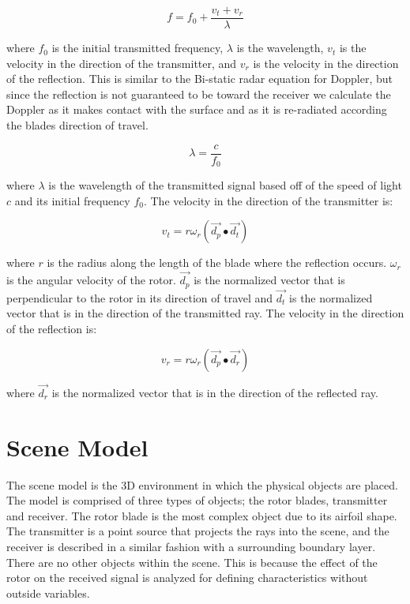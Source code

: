 \begin{equation}
	f = f_0 + \frac{v_t + v_r}{\lambda} %
	\label{eqn:observedShift}	
\end{equation}

where $f_0$ is the initial transmitted frequency, $\lambda$ is the wavelength, $v_t$ is the velocity in the direction of the transmitter, and $v_r$ is the velocity in the direction of the reflection. This is similar to the Bi-static radar equation for Doppler, but since the reflection is not guaranteed to be toward the receiver we calculate the Doppler as it makes contact with the surface and as it is re-radiated according the blades direction of travel.

\begin{equation}
	\lambda = \frac{c}{f_0}
	\label{eqn:wavelength}
\end{equation}

where $\lambda$ is the wavelength of the transmitted signal based off of the speed of light $c$ and its initial frequency $f_0$. The velocity in the direction of the transmitter is:

\begin{equation}
	v_t = r \omega_r (\vec{d_p} \bullet \vec{d_t})
	\label{eqn:v_t}
\end{equation}

where $r$ is the radius along the length of the blade where the reflection occurs. $\omega_r$ is the angular velocity of the rotor. $\vec{d_p}$ is the normalized vector that is perpendicular to the rotor in its direction of travel and $\vec{d_t}$ is the normalized vector that is in the direction of the transmitted ray. The velocity in the direction of the reflection is:

\begin{equation}
	v_r = r \omega_r (\vec{d_p} \bullet \vec{d_r})
	\label{eqn:v_r}
\end{equation}

where $\vec{d_r}$ is the normalized vector that is in the direction of the reflected ray.

\section{Scene Model}
The scene model is the 3D environment in which the physical objects are placed. 
The model is comprised of three types of objects; the rotor blades, transmitter and receiver. The rotor blade is the most complex object due to its airfoil shape. The transmitter is a point source that projects the rays into the scene, and the receiver is described in a similar fashion with a surrounding boundary layer. There are no other objects within the scene. This is because the effect of the rotor on the received signal is analyzed for defining characteristics without outside variables.

